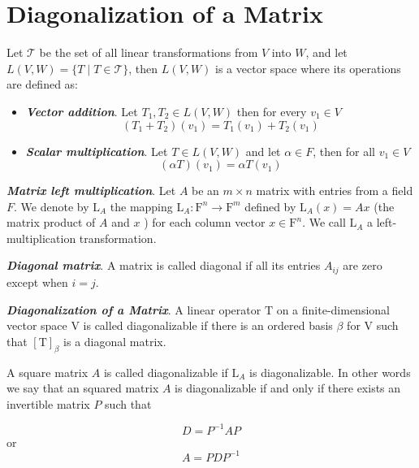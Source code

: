 \documentclass{report}
\begin{document}
    \section{Diagonalization of a Matrix}


    \begin{defBox}
        Let $\mathcal{T}$ be the set of all linear transformations from $V$ into $W$, and let $L(V,W) = \{T \mid T \in \mathcal{T}\}$, then $L(V,W)$ is a vector space where its operations are defined as:

        \begin{itemize}
            \item \textit{\textbf{Vector addition}}. Let $T_1, T_2 \in L(V,W)$ then for every $v_1 \in V$
            $$(T_1+T_2)(v_1) = T_1(v_1) + T_2(v_1)$$
            \item \textit{\textbf{Scalar multiplication}}. Let $T \in L(V,W)$ and let $\alpha \in F$, then for all $v_1 \in V$
            $$(\alpha T)(v_1) = \alpha T(v_1)$$
        \end{itemize}
    \end{defBox}

    \begin{defBox}
        \textit{\textbf{Matrix left multiplication}}. Let $A$ be an $m \times n$ matrix with entries from a field $F$. We denote by $\mathrm{L}_A$ the mapping $\mathrm{L}_A: \mathrm{F}^n \rightarrow \mathrm{F}^m$ defined by $\mathrm{L}_A(x)=A x$ (the matrix product of $A$ and $x$ ) for each column vector $x \in \mathrm{F}^n$. We call $\mathrm{L}_A$ a left-multiplication transformation.
    \end{defBox}

    \begin{defBox}
        \textit{\textbf{Diagonal matrix}}. A matrix is called diagonal if all its entries $A_{ij}$ are zero except when $i = j$.
    \end{defBox}

    \begin{defBox}
        \textit{\textbf{Diagonalization of a Matrix}}. A linear operator $\mathrm{T}$ on a finite-dimensional vector space $\mathrm{V}$ is called diagonalizable if there is an ordered basis $\beta$ for $\mathrm{V}$ such that $[\mathrm{T}]_\beta$ is a diagonal matrix.

        A square matrix $A$ is called diagonalizable if $\mathrm{L}_A$ is diagonalizable. In other words we say that an squared matrix $A$ is diagonalizable if and only if there exists an invertible matrix $P$ such that

        $$D = P^{-1}AP$$ or
        $$A = PDP^{-1}$$
    \end{defBox}
\end{document}
